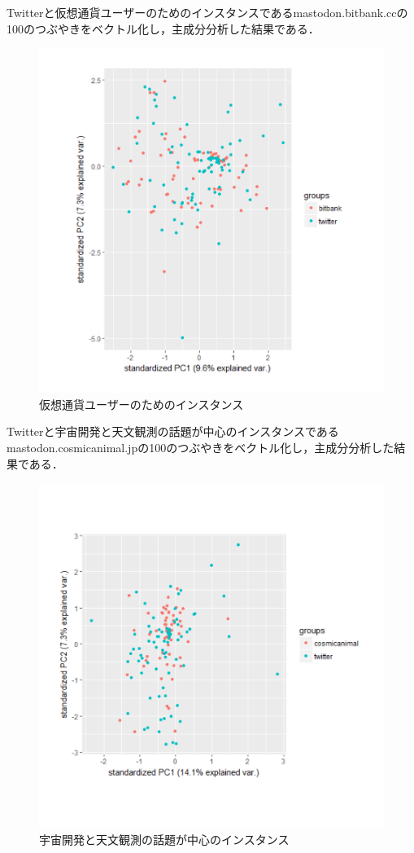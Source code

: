 Twitterと仮想通貨ユーザーのためのインスタンスであるmastodon.bitbank.ccの100のつぶやきをベクトル化し，主成分分析した結果である．
\begin{figure}[h]
\centering
\includegraphics[width=13cm,clip]{bitbank.pdf}
\caption{仮想通貨ユーザーのためのインスタンス}\label{bitbank}
\end{figure}
\newpage

Twitterと宇宙開発と天文観測の話題が中心のインスタンスであるmastodon.cosmicanimal.jpの100のつぶやきをベクトル化し，主成分分析した結果である．
\begin{figure}[h]
\centering
\includegraphics[width=13cm,clip]{cosmicanimal.pdf}
\caption{宇宙開発と天文観測の話題が中心のインスタンス}\label{cosmicanimal}
\end{figure}
\newpage

